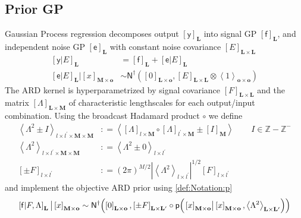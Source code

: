 \documentclass[preprint,12pt]{elsarticle}
\newcommand*{\M}[1]{\ensuremath{#1}\xspace}
\newcommand*{\x}{\times}
\newcommand*{\mi}[1]{\mathbf{#1}}
\newcommand*{\st}[1]{\mathbb{#1}}
\newcommand*{\rv}[1]{\mathsf{#1}}
\newcommand*{\te}[2][]{\left\lbrack{#2}\right\rbrack_{#1}}
\newcommand*{\diag}[2][]{\left\langle{#2}\right\rangle_{#1}}
\newcommand*{\prob}[3]{\M{\mathsf{p}\!\left(\left.{#1}\right\vert{#2,#3}\right)}}
\newcommand*{\deq}{\M{\mathrel{\mathop:}=}}
\newcommand*{\gaussd}[2]{\mathsf{N}^{\dagger}\!\left({#1,#2}\right)}
\newcommand*{\modulus}[1]{\M{\left\lvert{#1}\right\rvert}}
\begin{document}
        \subsection{Prior GP} \label{sub:GP:Prior}
            Gaussian Process regression decomposes output $\te[\mi{L}]{\rv{y}}$ into signal GP $\te[\mi{L}]{\rv{f}}$, and independent noise GP $\te[\mi{L}]{\rv{e}}$ with constant noise covariance $\te[\mi{L}\x\mi{L}]{E}$
            \begin{equation*}
                \begin{aligned}
                    \te[\mi{L}]{\rv{y}\vert E} 
                    &= \te[\mi{L}]{\rv{f}} + \te[\mi{L}]{\rv{e}\vert E} \\
                    \te[\mi{L}]{\rv{e}\vert E} \big\vert \te[\mi{M}\x\mi{o}]{x}
                    &\sim \gaussd{\te[\mi{L}\x\mi{o}]{0}}{\te[\mi{L}\x\mi{L}]{E} \otimes \diag[\mi{o}\x\mi{o}]{1}}
                \end{aligned}
            \end{equation*}
            The ARD kernel is hyperparametrized by signal covariance $\te[\mi{L}\x\mi{L}]{F}$ and the matrix $\te[\mi{L}\x\mi{M}]{\Lambda}$ of characteristic lengthscales for each output/input combination. 
            Using the broadcast Hadamard product $\circ$ we define
            \begin{equation*}
                \begin{aligned}
                    \diag[l\x l^{\prime}\x\mi{M}\x\mi{M}]{\Lambda^{2} \pm I} 
                    &\deq \diag{\te[l\x\mi{M}]{\Lambda} \circ \te[l^{\prime}\x\mi{M}]{\Lambda} \pm \te[\mi{M}]{I}} 
                    \qquad I \in \st{Z}-\st{Z}^{-} \\
                    \diag[l\x l^{\prime}\x\mi{M}\x\mi{M}]{\Lambda^{2}} &\deq 
                    \diag[l\x l^{\prime}]{\Lambda^{2} \pm 0} \\
                        \te[l\x l^{\prime}]{\pm F} 
                    &\deq (2 \pi)^{M/2} \modulus{\diag[l\x l^{\prime}]{\Lambda^{2}}}^{1/2} \te[l\x l^{\prime}]{F}
                \end{aligned}
            \end{equation*}
            and implement the objective ARD prior using \cref{def:Notation:p}
            \begin{equation*}
                \te[\mi{L}]{\rv{f} \vert F,\Lambda}
                \big\vert \te[\mi{M}\x\mi{o}]{x} \sim \\
                \gaussd{\te[\mi{L}\x\mi{o}]{0}}{\te[\mi{L}\x\mi{L^{\prime}}]{\pm F} \circ 
                \prob{\te[\mi{M}\x\mi{o}]{x}}{\te[\mi{M}\x\mi{o}]{x}}
                {\diag[\mi{L}\x\mi{L^{\prime}}]{\Lambda^{2}}}} 
            \end{equation*}
            
\end{document}
